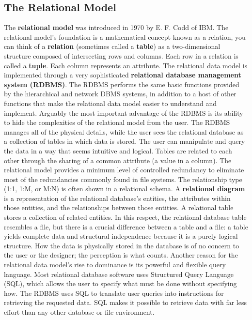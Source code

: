 \documentclass[a4paper, 12pt, titlepage]{report}
\begin{document}
\subsection{The Relational Model}
The \textbf{relational model} was introduced in 1970 by E. F. Codd of IBM. The relational model’s foundation is a mathematical concept known as a relation, you can think of a \textbf{relation} (sometimes called a \textbf{table}) as a two-dimensional structure composed of intersecting rows and columns. Each row in a relation is called a \textbf{tuple}. Each column represents an attribute. The relational data model is implemented through a very sophisticated \textbf{relational database management system (RDBMS)}. The RDBMS performs the same basic functions provided by the hierarchical and network DBMS systems, in addition to a host of other functions that make the relational data model easier to understand and implement. Arguably the most important advantage of the RDBMS is its ability to hide the complexities of the relational model from the user. The RDBMS manages all of the physical details, while the user sees the relational database as a collection of tables in which data is stored. The user can manipulate and query the data in a way that seems intuitive and logical. Tables are related to each other through the sharing of a common attribute (a value in a column).
The relational model provides a minimum level of controlled redundancy to eliminate most of the redundancies commonly found in file systems.
The relationship type (1:1, 1:M, or M:N) is often shown in a relational schema. A \textbf{relational diagram} is a representation of the relational database’s entities, the attributes within those entities, and the relationships between those entities.
A relational table stores a collection of related entities. In this respect, the relational database table resembles a file, but there is a crucial difference between a table and a file: a table yields complete data and structural independence because it is a purely logical structure. How the data is physically stored in the database is of no concern to the user or the designer; the perception is what counts.
Another reason for the relational data model’s rise to dominance is its powerful and flexible query language. Most relational database software uses Structured Query Language (SQL), which allows the user to specify what must be done without specifying how. The RDBMS uses SQL to translate user queries into instructions for retrieving the requested data. SQL makes it possible to retrieve data with far less effort than any other database or file environment.
\end{document}
